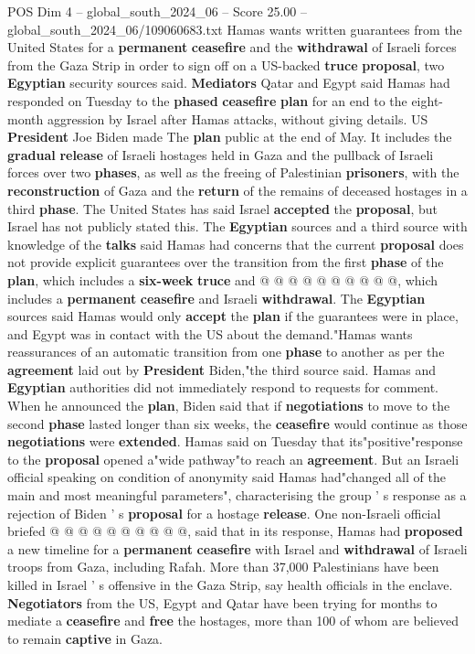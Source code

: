 \begin{textsample}{POS Dim 4 – global\_south\_2024\_06 – Score 25.00 – global\_south\_2024\_06/109060683.txt}  \label{ex:f4_pos_084}
Hamas wants written guarantees from the United States for a \textbf{permanent} \textbf{ceasefire} and the \textbf{withdrawal} of Israeli forces from the Gaza Strip in order to sign off on a US-backed \textbf{truce} \textbf{proposal}, two \textbf{Egyptian} security sources said. \textbf{Mediators} Qatar and Egypt said Hamas had responded on Tuesday to the \textbf{phased} \textbf{ceasefire} \textbf{plan} for an end to the eight-month aggression by Israel after Hamas attacks, without giving details.
US \textbf{President} Joe Biden made The \textbf{plan} public at the end of May.
It includes the \textbf{gradual} \textbf{release} of Israeli hostages held in Gaza and the pullback of Israeli forces over two \textbf{phases}, as well as the freeing of Palestinian \textbf{prisoners}, with the \textbf{reconstruction} of Gaza and the \textbf{return} of the remains of deceased hostages in a third \textbf{phase}.
The United States has said Israel \textbf{accepted} the \textbf{proposal}, but Israel has not publicly stated this.
The \textbf{Egyptian} sources and a third source with knowledge of the \textbf{talks} said Hamas had concerns that the current \textbf{proposal} does not provide explicit guarantees over the transition from the first \textbf{phase} of the \textbf{plan}, which includes a \textbf{six-week} \textbf{truce} and @ @ @ @ @ @ @ @ @ @, which includes a \textbf{permanent} \textbf{ceasefire} and Israeli \textbf{withdrawal}.
The \textbf{Egyptian} sources said Hamas would only \textbf{accept} the \textbf{plan} if the guarantees were in place, and Egypt was in contact with the US about the demand."Hamas wants reassurances of an automatic transition from one \textbf{phase} to another as per the \textbf{agreement} laid out by \textbf{President} Biden,"the third source said.
Hamas and \textbf{Egyptian} authorities did not immediately respond to requests for comment.
When he announced the \textbf{plan}, Biden said that if \textbf{negotiations} to move to the second \textbf{phase} lasted longer than six weeks, the \textbf{ceasefire} would continue as those \textbf{negotiations} were \textbf{extended}.
Hamas said on Tuesday that its"positive"response to the \textbf{proposal} opened a"wide pathway"to reach an \textbf{agreement}.
But an Israeli official speaking on condition of anonymity said Hamas had"changed all of the main and most meaningful parameters", characterising the group ' s response as a rejection of Biden ' s \textbf{proposal} for a hostage \textbf{release}.
One non-Israeli official briefed @ @ @ @ @ @ @ @ @ @, said that in its response, Hamas had \textbf{proposed} a new timeline for a \textbf{permanent} \textbf{ceasefire} with Israel and \textbf{withdrawal} of Israeli troops from Gaza, including Rafah.
More than 37,000 Palestinians have been killed in Israel ' s offensive in the Gaza Strip, say health officials in the enclave. \textbf{Negotiators} from the US, Egypt and Qatar have been trying for months to mediate a \textbf{ceasefire} and \textbf{free} the hostages, more than 100 of whom are believed to remain \textbf{captive} in Gaza.


\end{textsample}
